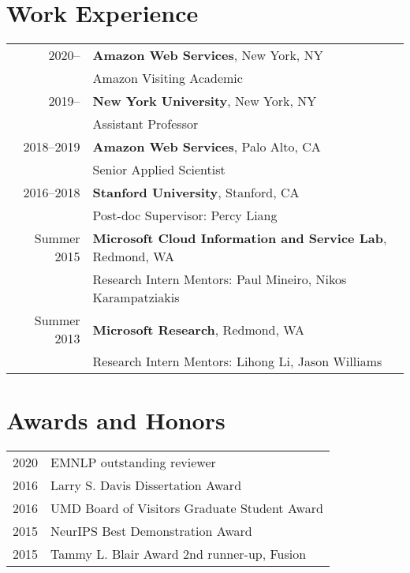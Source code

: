 \documentclass[a4paper,11pt]{article}
\begin{document}
\section{Work Experience}
\begin{tabular}{rl}    
2020--   & \textbf{Amazon Web Services}, New York, NY \\
    & Amazon Visiting Academic \\[1.5ex]
2019--   & \textbf{New York University}, New York, NY \\
    & Assistant Professor \\[1.5ex]
2018--2019  & \textbf{Amazon Web Services}, Palo Alto, CA \\
    & Senior Applied Scientist \\[1.5ex]
2016--2018 & \textbf{Stanford University}, Stanford, CA\\
& Post-doc \hspace{2em} Supervisor: Percy Liang \\[1.5ex]
Summer 2015 & {\bf Microsoft Cloud Information and Service Lab}, Redmond, WA\\
& Research Intern \hspace{2em} Mentors: Paul Mineiro, Nikos Karampatziakis\\[1.5ex]
Summer 2013 & {\bf Microsoft Research}, Redmond, WA\\
& Research Intern \hspace{2em} Mentors: Lihong Li, Jason Williams
\end{tabular}

\section{Awards and Honors}
\begin{tabular}{rl}    
2020 & EMNLP outstanding reviewer \\
2016 & Larry S. Davis Dissertation Award\\
2016 & UMD Board of Visitors Graduate Student Award\\
2015 & NeurIPS Best Demonstration Award\\
2015 & Tammy L. Blair Award 2nd runner-up, Fusion\\
\end{tabular}
\end{document}
